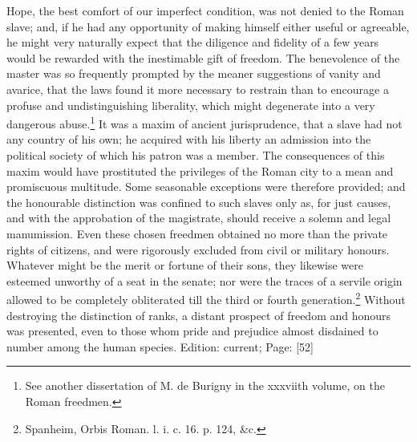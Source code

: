 Hope, the best comfort of our imperfect condition, was not denied to the Roman slave; and, if he had any opportunity of making himself either useful or agreeable, he might very naturally expect that the diligence and fidelity of a few years would be rewarded with the inestimable gift of freedom. The benevolence of the master was so frequently prompted by the meaner suggestions of vanity and avarice, that the laws found it more necessary to restrain than to encourage a profuse and undistinguishing liberality, which might degenerate into a very dangerous abuse.\footnote{See another dissertation of M. de Burigny in the xxxviith volume, on the Roman freedmen.} It was a maxim of ancient jurisprudence, that a slave had not any country of his own; he acquired with his liberty an admission into the political society of which his patron was a member. The consequences of this maxim would have prostituted the privileges of the Roman city to a mean and promiscuous multitude. Some seasonable exceptions were therefore provided; and the honourable distinction was confined to such slaves only as, for just causes, and with the approbation of the magistrate, should receive a solemn and legal manumission. Even these chosen freedmen obtained no more than the private rights of citizens, and were rigorously excluded from civil or military honours. Whatever might be the merit or fortune of their sons, they likewise were esteemed unworthy of a seat in the senate; nor were the traces of a servile origin allowed to be completely obliterated till the third or fourth generation.\footnote{Spanheim, Orbis Roman. l. i. c. 16. p. 124, \&c.} Without destroying the distinction of ranks, a distant prospect of freedom and honours was presented, even to those whom pride and prejudice almost disdained to number among the human species.
Edition: current; Page: [52]

